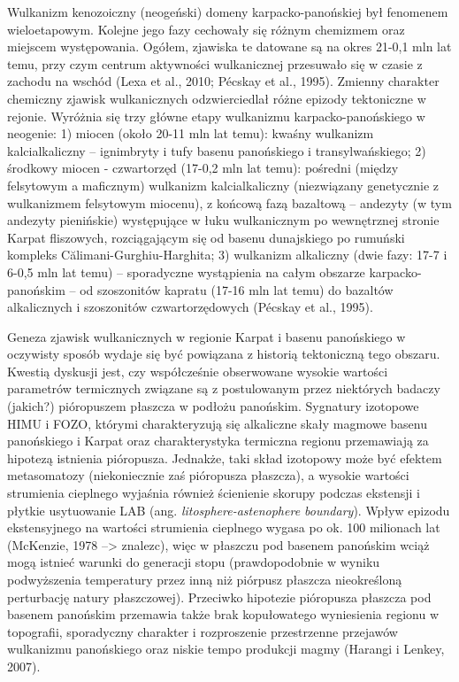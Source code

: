 \documentclass[11.5pt,twoside]{report}
\begin{document}

Wulkanizm kenozoiczny (neogeński) domeny karpacko-panońskiej był fenomenem wieloetapowym. Kolejne jego fazy cechowały się różnym chemizmem oraz miejscem występowania. Ogółem, zjawiska te datowane są na okres 21-0,1 mln lat temu, przy czym centrum aktywności wulkanicznej przesuwało się w czasie z zachodu na wschód (Lexa et al., 2010; P\'{e}cskay et al., 1995). Zmienny charakter chemiczny zjawisk wulkanicznych odzwierciedlał różne epizody tektoniczne w rejonie. Wyróżnia się trzy główne etapy wulkanizmu karpacko-panońskiego w neogenie: 1) miocen (około 20-11 mln lat temu): kwaśny wulkanizm kalcialkaliczny -- ignimbryty i tufy basenu panońskiego i transylwańskiego; 2) środkowy miocen - czwartorzęd (17-0,2 mln lat temu): pośredni (między felsytowym a maficznym) wulkanizm kalcialkaliczny (niezwiązany genetycznie z wulkanizmem felsytowym miocenu), z końcową fazą bazaltową -- andezyty (w tym andezyty pienińskie) występujące w łuku wulkanicznym po wewnętrznej stronie Karpat fliszowych, rozciągającym się od basenu dunajskiego po rumuński kompleks Călimani-Gurghiu-Harghita; 3) wulkanizm alkaliczny (dwie fazy: 17-7 i 6-0,5 mln lat temu) -- sporadyczne wystąpienia na całym obszarze karpacko-panońskim -- od szoszonitów kapratu (17-16 mln lat temu) do bazaltów alkalicznych i szoszonitów czwartorzędowych (P\'{e}cskay et al., 1995).
  
Geneza zjawisk wulkanicznych w regionie Karpat i basenu panońskiego w oczywisty sposób wydaje się być powiązana z historią tektoniczną tego obszaru. Kwestią dyskusji jest, czy współcześnie obserwowane wysokie wartości parametrów termicznych związane są z postulowanym przez niektórych badaczy (jakich?) pióropuszem płaszcza w podłożu panońskim. Sygnatury izotopowe HIMU i FOZO, którymi charakteryzują się alkaliczne skały magmowe basenu panońskiego i Karpat oraz charakterystyka termiczna regionu przemawiają za hipotezą istnienia pióropusza. Jednakże, taki skład izotopowy może być efektem metasomatozy (niekoniecznie zaś pióropusza płaszcza), a wysokie wartości strumienia cieplnego wyjaśnia również ścienienie skorupy podczas ekstensji i płytkie usytuowanie LAB (ang. \textit{litosphere-astenophere boundary}). Wpływ epizodu ekstensyjnego na wartości strumienia cieplnego wygasa po ok. 100 milionach lat (McKenzie, 1978 --> znalezc), więc w płaszczu pod basenem panońskim wciąż mogą istnieć warunki do generacji stopu (prawdopodobnie w wyniku podwyższenia temperatury przez inną niż piórpusz płaszcza nieokreśloną perturbację natury płaszczowej). Przeciwko hipotezie pióropusza płaszcza pod basenem panońskim przemawia także brak kopułowatego wyniesienia regionu w topografii, sporadyczny charakter i rozproszenie przestrzenne przejawów wulkanizmu panońskiego oraz niskie tempo produkcji magmy (Harangi i Lenkey, 2007).    
  
\end{document}
